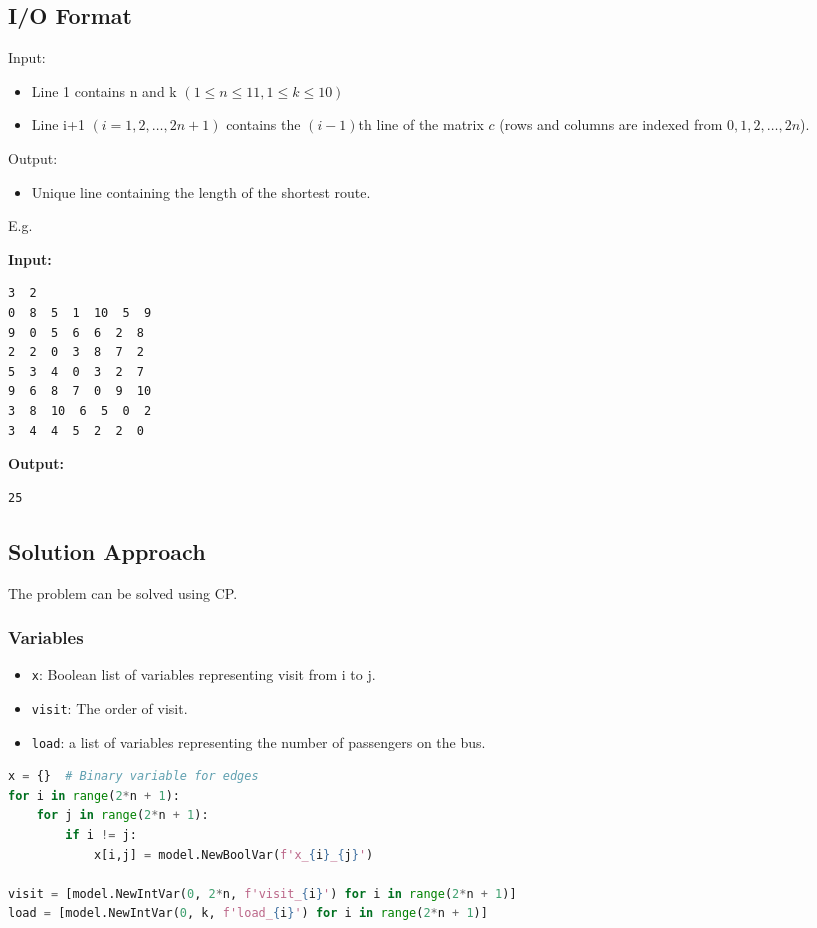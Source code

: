 \documentclass{article}
\begin{document}
\subsection{I/O Format}
Input:
\begin{itemize}
    \item Line 1 contains n and k $(1\le n\le 11,1 \le k \le 10)$
    \item Line i+1 $(i=1,2,\dots,2n+1)$ contains the $(i - 1)$th
    line of the matrix $c$ (rows and columns are indexed from $0,1,2, \dots,2n$).
\end{itemize}

Output:
\begin{itemize}
    \item Unique line containing the length of the shortest route.
\end{itemize}

E.g.
\begin{multicols}{2}
\textbf{Input:}
\begin{verbatim}
3  2
0  8  5  1  10  5  9
9  0  5  6  6  2  8
2  2  0  3  8  7  2
5  3  4  0  3  2  7
9  6  8  7  0  9  10
3  8  10  6  5  0  2
3  4  4  5  2  2  0
\end{verbatim}
\columnbreak
\textbf{Output:}
\begin{verbatim}
25
\end{verbatim}
\end{multicols}

\subsection{Solution Approach}
The problem can be solved using CP.
\subsubsection{Variables}
\begin{itemize}
    \item \verb|x|: Boolean list of variables representing visit from i to j.
    \item \verb|visit|: The order of visit.
    \item \verb|load|: a list of variables representing the number of passengers on the bus.
\end{itemize}
\pagebreak
\begin{lstlisting}[language=Python]
x = {}  # Binary variable for edges
for i in range(2*n + 1):
    for j in range(2*n + 1):
        if i != j:
            x[i,j] = model.NewBoolVar(f'x_{i}_{j}')

visit = [model.NewIntVar(0, 2*n, f'visit_{i}') for i in range(2*n + 1)]
load = [model.NewIntVar(0, k, f'load_{i}') for i in range(2*n + 1)]
\end{lstlisting}
\end{document}

